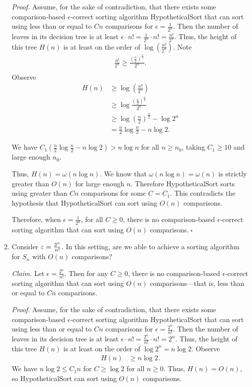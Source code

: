 \begin{enumerate}[resume]
\begin{solution}
\textit{Proof. }Assume, for the sake of contradiction, that there exists some comparison-based $\epsilon$-correct sorting algorithm {\sc HypotheticalSort} that can sort using less than or equal to $Cn$ comparisons for $\epsilon=\frac{1}{2^n}$. Then the number of leaves in its decision tree is at least $\epsilon\cdot n!=\frac{1}{2^n}\cdot n!=\frac{n!}{2^n}$. Thus, the height of this tree $H(n)$ is at least on the order of $\log\left(\frac{n!}{2^n}\right)$. Note
\begin{align*}
\frac{n!}{2^n}\geq\frac{\left(\frac{n}{2}\right)^{\frac{n}{2}}}{2^n}.\\
\end{align*}
Observe
\begin{align*}
H(n)&\geq\log\left(\frac{n!}{2^n}\right)\\
&\geq\log\frac{\left(\frac{n}{2}\right)^{\frac{n}{2}}}{2^n}\\
&\geq\log\left(\frac{n}{2}\right)^{\frac{n}{2}}-\log2^n\\
&=\frac{n}{2}\log\frac{n}{2}-n\log 2.
\end{align*}

We have $C_1\left(\frac{n}{2}\log\frac{n}{2}-n\log 2\right)>n\log n$ for all $n\geq n_0$, taking $C_1\geq 10$ and large enough $n_0$.

Thus, $H(n)=\omega(n\log n)$. We know that $\omega(n\log n)=\omega(n)$ is strictly greater than $O(n)$ for large enough $n$. Therefore {\sc HypotheticalSort} sorts using greater than $Cn$ comparisons for some $C=C_1$. This contradicts the hypothesis that {\sc HypotheticalSort} can sort using $O(n)$ comparisons.

Therefore, when $\epsilon=\frac{1}{2^n}$, for all $C\geq 0$, there is no comparison-based $\epsilon$-correct sorting algorithm that can sort using $O(n)$ comparisons.$~\square$
\end{solution}
    
    \item Consider $\varepsilon=\frac{2^n}{n!}$. In this setting, are we able to achieve a sorting algorithm for $S_n$ with $O(n)$ comparisons?
\begin{solution}
\textit{Claim. }Let $\epsilon=\frac{2^n}{n!}$. Then for any $C\geq 0$, there is no comparison-based $\epsilon$-correct sorting algorithm that can sort using $O(n)$ comparisons---that is, less than or equal to $Cn$ comparisons.

\textit{Proof. }Assume, for the sake of contradiction, that there exists some comparison-based $\epsilon$-correct sorting algorithm {\sc HypotheticalSort} that can sort using less than or equal to $Cn$ comparisons for $\epsilon=\frac{2^n}{n!}$. Then the number of leaves in its decision tree is at least $\epsilon\cdot n!=\frac{2^n}{n!}\cdot n!=2^n$. Thus, the height of this tree $H(n)$ is at least on the order of $\log 2^n=n\log 2$. Observe
\begin{align*}
H(n)&\geq n\log 2.
\end{align*}
We have $n\log{2}\leq C_1n$ for $C\geq\log{2}$ for all $n\geq 0$. Thus, $H(n)=O(n)$, so {\sc HypotheticalSort} can sort using $O(n)$ comparisons.


\end{solution}
\end{enumerate}
